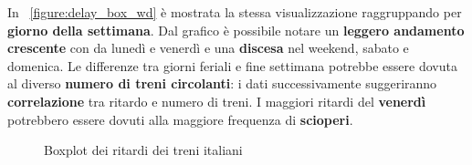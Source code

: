 \documentclass[12pt,italian]{report}
\begin{document}
In \figurename~\ref{figure:delay_box_wd} è mostrata la stessa
visualizzazione raggruppando per \textbf{giorno della settimana}.  Dal
grafico è possibile notare un \textbf{leggero andamento crescente} con
da lunedì e venerdì e una \textbf{discesa} nel weekend, sabato e
domenica.  Le differenze tra giorni feriali e fine settimana potrebbe
essere dovuta al diverso \textbf{numero di treni circolanti}: i dati
successivamente suggeriranno \textbf{correlazione} tra ritardo e
numero di treni.  I maggiori ritardi del \textbf{venerdì} potrebbero
essere dovuti alla maggiore frequenza di \textbf{scioperi}.

\begin{figure}[p] \centering
     \vspace{5mm}
    \caption{Boxplot dei ritardi dei treni italiani}
\end{figure}
\end{document}
